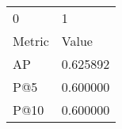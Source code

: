 \begin{tabular}{ll}
0 & 1 \\
Metric & Value \\
AP & 0.625892 \\
P@5 & 0.600000 \\
P@10 & 0.600000 \\
\end{tabular}
